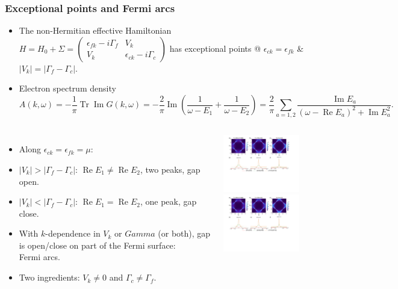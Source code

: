 \documentclass[xcolor=table, 10pt, aspectratio=169]{beamer}
\DeclareMathOperator{\tr}{Tr}
\DeclareMathOperator{\im}{Im}
\DeclareMathOperator{\re}{Re}
\begin{document}
\begin{frame}
\frametitle{Exceptional points and Fermi arcs}
\begin{itemize}
\item The non-Hermitian effective Hamiltonian $H = H_0+\Sigma = \begin{pmatrix}
\epsilon_{fk} - i\Gamma_f & V_k\\ V_k & \epsilon_{ck} - i\Gamma_c
\end{pmatrix}$ has {\color{blue}exceptional points} @ $\epsilon_{ck}=\epsilon_{fk}$ \&
$|V_k|=|\Gamma_f-\Gamma_c|$.
\item Electron spectrum density
\[A(k, \omega)=-\frac1\pi\tr\im G(k, \omega)
=-\frac2\pi\im\left(
\frac1{\omega-E_1}+\frac1{\omega-E_2}\right)
=\frac2\pi\sum_{a=1,2}\frac{\im E_a}{(\omega-\re E_a)^2+\im E_a^2}.\]
\end{itemize}

\begin{columns}
\begin{itemize}
\item Along $\epsilon_{ck}=\epsilon_{fk}=\mu$:
\item $|V_k|>|\Gamma_f-\Gamma_c|$: $\re E_1\neq\re E_2$, two peaks, gap open.
\item $|V_k|<|\Gamma_f-\Gamma_c|$: $\re E_1=\re E_2$, one peak, gap close.
\item With $k$-dependence in $V_k$ or $Gamma$ (or both), gap is open/close on part of the Fermi surface: \\{\color{blue}Fermi arcs}.
\item Two ingredients: $V_k\neq0$ and $\Gamma_c\neq\Gamma_f$.
\end{itemize}
	\includegraphics[height=2.5cm]{arc1}
	\includegraphics[height=2.5cm]{arc2}
\end{columns}
\end{frame}
\end{document}
